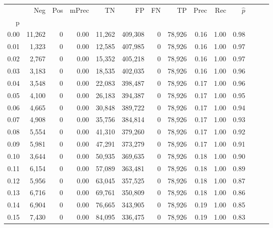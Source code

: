 \begin{tabular}{rrrrrrrrrrrrrr}
\toprule
{} &     Neg &    Pos & mPrec &       TN &       FP &      FN &      TP &  Prec &   Rec & $\hat{p}$ \\
p    &         &        &       &          &          &         &         &       &       &           \\
\midrule
0.00 &  11,262 &      0 &  0.00 &   11,262 &  409,308 &       0 &  78,926 &  0.16 &  1.00 &      0.98 \\
0.01 &   1,323 &      0 &  0.00 &   12,585 &  407,985 &       0 &  78,926 &  0.16 &  1.00 &      0.97 \\
0.02 &   2,767 &      0 &  0.00 &   15,352 &  405,218 &       0 &  78,926 &  0.16 &  1.00 &      0.97 \\
0.03 &   3,183 &      0 &  0.00 &   18,535 &  402,035 &       0 &  78,926 &  0.16 &  1.00 &      0.96 \\
0.04 &   3,548 &      0 &  0.00 &   22,083 &  398,487 &       0 &  78,926 &  0.17 &  1.00 &      0.96 \\
0.05 &   4,100 &      0 &  0.00 &   26,183 &  394,387 &       0 &  78,926 &  0.17 &  1.00 &      0.95 \\
0.06 &   4,665 &      0 &  0.00 &   30,848 &  389,722 &       0 &  78,926 &  0.17 &  1.00 &      0.94 \\
0.07 &   4,908 &      0 &  0.00 &   35,756 &  384,814 &       0 &  78,926 &  0.17 &  1.00 &      0.93 \\
0.08 &   5,554 &      0 &  0.00 &   41,310 &  379,260 &       0 &  78,926 &  0.17 &  1.00 &      0.92 \\
0.09 &   5,981 &      0 &  0.00 &   47,291 &  373,279 &       0 &  78,926 &  0.17 &  1.00 &      0.91 \\
0.10 &   3,644 &      0 &  0.00 &   50,935 &  369,635 &       0 &  78,926 &  0.18 &  1.00 &      0.90 \\
0.11 &   6,154 &      0 &  0.00 &   57,089 &  363,481 &       0 &  78,926 &  0.18 &  1.00 &      0.89 \\
0.12 &   5,956 &      0 &  0.00 &   63,045 &  357,525 &       0 &  78,926 &  0.18 &  1.00 &      0.87 \\
0.13 &   6,716 &      0 &  0.00 &   69,761 &  350,809 &       0 &  78,926 &  0.18 &  1.00 &      0.86 \\
0.14 &   6,904 &      0 &  0.00 &   76,665 &  343,905 &       0 &  78,926 &  0.19 &  1.00 &      0.85 \\
0.15 &   7,430 &      0 &  0.00 &   84,095 &  336,475 &       0 &  78,926 &  0.19 &  1.00 &      0.83 \\

\end{tabular}
